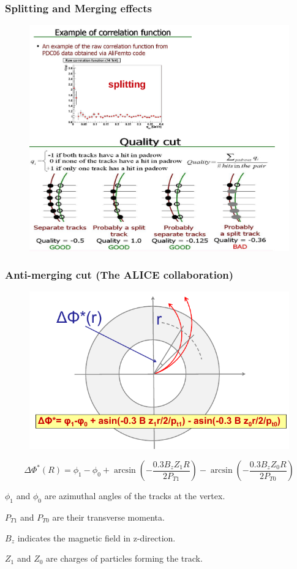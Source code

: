 \documentclass[dvipsnames] {beamer}
\begin{document}
\begin{frame}
  \frametitle{Splitting and Merging effects}
  \begin{block}{}
 \begin{figure}[H]
     \includegraphics[width=.70\linewidth]{splitting_demo.png}
   \end{figure}
  \end{block}
\end{frame}

\begin{frame}
  \frametitle{Anti-merging cut (The ALICE collaboration)}
  \begin{block}{}
    \begin{figure}[H]
      \includegraphics[width=.45\linewidth]{PhiStar.png}
    \end{figure}
  \end{block}
  \begin{block}{}
    \bf \centering 
    \begin{equation*}
      \Delta \Phi^{*}(R) = \phi_{1} - \phi_{0} + \arcsin \left(-\dfrac{0.3 B_{z} Z_{1} R}{2 P_{T1}}\right) - \arcsin \left(-\dfrac{0.3 B_{z} Z_{0} R}{2 P_{T0}}\right)
    \end{equation*}
        {\footnotesize
          $\phi_{1}$ and $\phi_{0}$ are azimuthal angles of the tracks at the vertex.
          
          $P_{T1}$ and $P_{T0}$ are their transverse momenta.
          
          $B_{z}$ indicates the magnetic field in z-direction.
          
          $Z_{1}$ and $Z_{0}$ are charges of particles forming the track.
        }
  \end{block}
 \end{frame}
\end{document}
